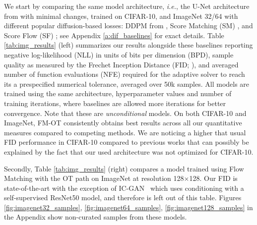 \documentclass{article}
\makeatletter
\newcommand{\ie}{{i.e.}}
\renewcommand*{\ie}{{\it i.e.}\@\xspace}
\makeatother
\begin{document}
{We start by comparing the same model architecture, \ie, the U-Net architecture from \citet{dhariwal2021diffusion} with minimal changes, trained on CIFAR-10, and ImageNet 32/64 with different popular diffusion-based losses: DDPM from \citep{ho2020denoising}, Score Matching (SM) \citep{song2020score}, and Score Flow (SF) \citep{song2021maximum}; see Appendix \ref{a:dif_baselines} for exact details.} Table \ref{tab:img_results} (left)  summarizes our results alongside these baselines reporting negative log-likelihood (NLL) in units of bits per dimension (BPD), sample quality as measured by the Frechet Inception Distance (FID; \citet{heusel2017gans}), and averaged number of function evaluations (NFE) required for the adaptive solver to reach its a prespecified numerical tolerance, averaged over 50k samples. All models are trained using the same architecture, hyperparameter values and number of training iterations, where baselines are allowed more iterations for better convergence. Note that these are \emph{unconditional} models. 
%
{On both CIFAR-10 and ImageNet, FM-OT consistently obtains best results across all our quantitative measures compared to competing methods. We are noticing a higher that usual FID performance in CIFAR-10 compared to previous works \citep{ho2020denoising,song2020score,song2021maximum} that can possibly be explained by the fact that our used architecture was not optimized for CIFAR-10.}

{Secondly, Table \ref{tab:img_results} (right) compares a model trained using Flow Matching with the OT path on ImageNet at resolution 128$\times$128. Our FID is state-of-the-art with the exception of IC-GAN~\citep{casanova2021instance} which uses conditioning with a self-supervised ResNet50 model, and therefore is left out of this table. } Figures \ref{fig:imagenet32_samples}, \ref{fig:imagenet64_samples}, \ref{fig:imagenet128_samples} in the Appendix show non-curated samples from these models. 
\end{document}
